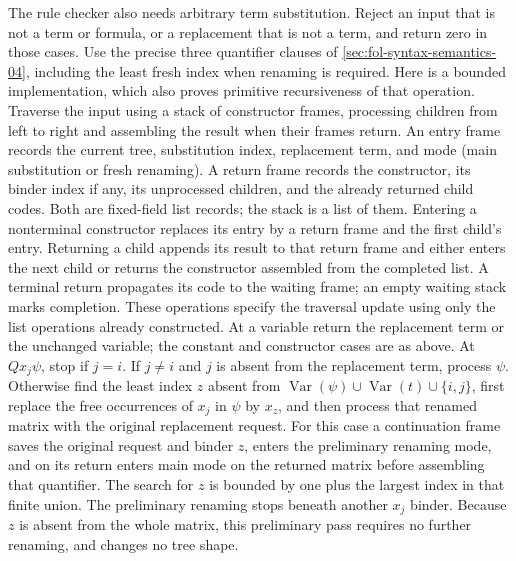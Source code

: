 The rule checker also needs arbitrary term substitution.  Reject an input
that is not a term or formula, or a replacement that is not a term, and
return zero in those cases.  Use the precise
three quantifier clauses of \cref{sec:fol-syntax-semantics-04}, including
the least fresh index when renaming is required.  Here is a bounded
implementation, which also proves primitive recursiveness of that operation.
Traverse the input using a stack of constructor frames, processing children
from left to right and assembling the result when their frames return.
An entry frame records the current tree, substitution index, replacement
term, and mode (main substitution or fresh renaming).  A return frame
records the constructor, its binder index if any, its unprocessed children,
and the already returned child codes.  Both are fixed-field list records;
the stack is a list of them.  Entering a nonterminal constructor replaces
its entry by a return frame and the first child's entry.  Returning a
child appends its result to that return frame and either enters the next
child or returns the constructor assembled from the completed list.  A
terminal return propagates its code to the waiting frame; an empty waiting
stack marks completion.  These operations specify the traversal update
using only the list operations already constructed.
At a variable return the replacement term or the unchanged variable; the
constant and constructor cases are as above.  At \(Qx_j\psi\), stop
if \(j=i\).  If \(j\ne i\) and \(j\) is absent from the replacement
term, process \(\psi\).  Otherwise find the least index \(z\) absent
from \(\operatorname{Var}(\psi)\cup\operatorname{Var}(t)\cup\{i,j\}\),
first replace the free occurrences of \(x_j\) in \(\psi\) by \(x_z\),
and then process that renamed matrix with the original replacement request.
For this case a continuation frame saves the original request and binder
\(z\), enters the preliminary renaming mode, and on its return enters
main mode on the returned matrix before assembling that quantifier.
The search for \(z\) is bounded by one plus the largest index in that
finite union.  The preliminary renaming stops beneath another \(x_j\)
binder.  Because \(z\) is absent from the whole matrix, this preliminary
pass requires no further renaming, and changes no tree shape.


